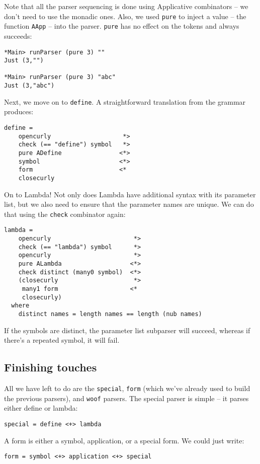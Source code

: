 \documentclass{tmr}
\begin{document}
Note that all the parser sequencing is done using Applicative
combinators -- we don't need to use the monadic ones.  Also, we used \verb+pure+ 
to inject a value -- the function \verb+AApp+ -- into the parser.  \verb+pure+ 
has no effect on the tokens and always succeeds:
\begin{verbatim}
*Main> runParser (pure 3) ""
Just (3,"")

*Main> runParser (pure 3) "abc"
Just (3,"abc")
\end{verbatim}

Next, we move on to \verb+define+.
A straightforward translation from the grammar produces:
\begin{verbatim}
define =
    opencurly                    *>
    check (== "define") symbol   *>
    pure ADefine                <*>
    symbol                      <*>
    form                        <*
    closecurly
\end{verbatim}

On to Lambda!  Not only does Lambda have additional syntax with its parameter 
list, but we also need to ensure that the parameter names are unique.  We can 
do that using the \verb+check+ combinator again:
\begin{verbatim}
lambda = 
    opencurly                       *>
    check (== "lambda") symbol      *>
    opencurly                       *>
    pure ALambda                   <*>
    check distinct (many0 symbol)  <*>
    (closecurly                     *>
     many1 form                    <*
     closecurly)
  where
    distinct names = length names == length (nub names)
\end{verbatim}
If the symbols are distinct, the parameter list subparser will succeed,
whereas if there's a repeated symbol, it will fail.

\subsection{Finishing touches}
All we have left to do are the \verb+special+, \verb+form+ (which 
we've already used to build the previous parsers), and \verb+woof+ parsers.  
The special parser is simple -- it parses either define or lambda:
\begin{verbatim}
special = define <+> lambda
\end{verbatim}

A form is either a symbol, application, or a special form.  We could just write:
\begin{verbatim}
form = symbol <+> application <+> special
\end{verbatim}
\end{document}
